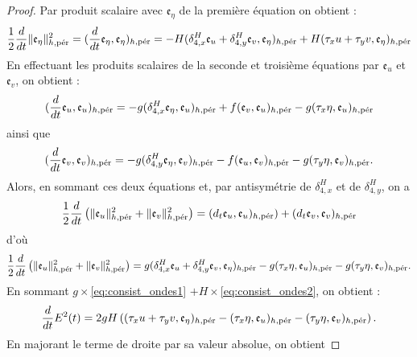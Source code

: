 \begin{proof}
Par produit scalaire avec $\mathfrak{e}_{\eta}$ de la première équation on obtient :
\begin{equation}
\dfrac{1}{2} \dfrac{d}{dt} \| \mathfrak{e}_{\eta} \|_{h,\per}^2 = (\dfrac{d}{dt} \mathfrak{e}_{\eta}, \mathfrak{e}_{\eta})_{h,\per} = - H ( \delta_{4,x}^H \mathfrak{e}_{u} + \delta_{4,y}^H \mathfrak{e}_{v}, \mathfrak{e}_{\eta})_{h,\per}  + H ( \tau_x u + \tau_y v, \mathfrak{e}_{\eta})_{h,\per}
\label{eq:consist_ondes1}
\end{equation}
En effectuant les produits scalaires de la seconde et troisième équations par $\mathfrak{e}_u$ et $\mathfrak{e}_v$, on obtient :
\begin{equation}
(\dfrac{d}{dt} \mathfrak{e}_u, \mathfrak{e}_u)_{h,\per} = - g (\delta_{4,x}^H \mathfrak{e}_{\eta}, \mathfrak{e}_u)_{h,\per} + f(\mathfrak{e}_v, \mathfrak{e}_u)_{h,\per} - g(\tau_x \eta, \mathfrak{e}_u)_{h,\per}
\end{equation}
ainsi que 
\begin{equation}
(\dfrac{d}{dt} \mathfrak{e}_v, \mathfrak{e}_v)_{h,\per} = - g (\delta_{4,y}^H \mathfrak{e}_{\eta}, \mathfrak{e}_v)_{h,\per} - f(\mathfrak{e}_u, \mathfrak{e}_v)_{h,\per} - g(\tau_y \eta, \mathfrak{e}_v)_{h,\per}.
\end{equation}
Alors, en sommant ces deux équations et, par antisymétrie de $\delta_{4,x}^H$ et de $\delta_{4,y}^H$, on a
\begin{equation}
\dfrac{1}{2} \dfrac{d}{dt} \left( \| \mathfrak{e}_{u} \|_{h,\per}^2 + \| \mathfrak{e}_{v} \|_{h,\per}^2 \right) = (d_t \mathfrak{e}_u, \mathfrak{e}_u)_{h,\per}) + (d_t \mathfrak{e}_v, \mathfrak{e}_v)_{h,\per} 
\end{equation}
d'où 
\begin{equation}
\dfrac{1}{2} \dfrac{d}{dt} \left( \| \mathfrak{e}_{u} \|_{h,\per}^2 + \| \mathfrak{e}_{v} \|_{h,\per}^2 \right) = g (\delta_{4,x}^H \mathfrak{e}_u + \delta_{4,y}^H \mathfrak{e}_v, \mathfrak{e}_{\eta})_{h,\per} - g(\tau_x \eta, \mathfrak{e}_u)_{h,\per} - g(\tau_y \eta, \mathfrak{e}_v)_{h,\per}.
\label{eq:consist_ondes2}
\end{equation}
En sommant $g \times $\eqref{eq:consist_ondes1} $+ H \times$\eqref{eq:consist_ondes2}, on obtient :
\begin{equation}
\dfrac{d}{dt} E^2(t) = 2 g H \left( (\tau_x u + \tau_y v, \mathfrak{e}_{\eta})_{h,\per} - (\tau_x \eta, \mathfrak{e}_u )_{h,\per} - (\tau_y \eta, \mathfrak{e}_v )_{h,\per} \right).
\end{equation}
En majorant le terme de droite par sa valeur absolue, on obtient

\end{proof}
